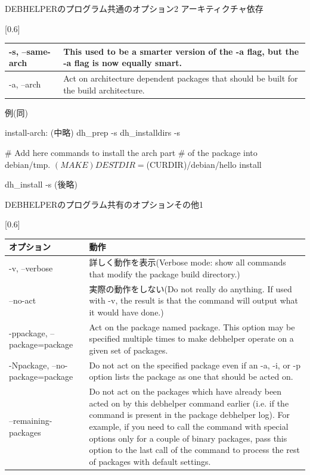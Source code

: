 \begin{frame}[containsverbatim]{DEBHELPERのプログラム共通のオプション2}
アーキティクチャ依存
\begin{table}[htb]
\scalebox{0.6}[0.6]{
\begin{tabular}{|l|p{30em}|} \hline
-s, --same-arch & This used to be a smarter version of the -a flag, but the -a flag is now equally smart. \\ \hline
-a, --arch & Act on architecture dependent packages that should be built for the build architecture. \\ \hline
\end{tabular}
}
\end{table}
例(同)
\begin{commandline}
install-arch:
	(中略)
        dh_prep -s 
        dh_installdirs -s

        # Add here commands to install the arch part 
        # of the package into debian/tmp.
        $(MAKE) DESTDIR=$(CURDIR)/debian/hello install

        dh_install -s
	(後略)
\end{commandline}
\end{frame}

\begin{frame}{DEBHELPERのプログラム共有のオプションその他1}
\begin{table}[htb]
\scalebox{0.6}[0.6]{
\begin{tabular}{|l|p{30em}|} \hline
オプション & 動作 \\ \hline
-v, --verbose & 詳しく動作を表示(Verbose mode: show all commands that modify the package build directory.) \\ \hline
--no-act & 実際の動作をしない(Do not really do anything. If used with -v, the result is that the command will output what it would have done.) \\ \hline
-ppackage, --package=package & Act on the package named package. This option may be specified multiple times to make debhelper operate on a given set of packages. \\ \hline
-Npackage, --no-package=package & Do not act on the specified package even if an -a, -i, or -p option lists the package as one that should be acted on.  \\ \hline
--remaining-packages & Do not act on the packages which have already been acted on by this debhelper command earlier (i.e. if the command is present in the package debhelper log).  For
           example, if you need to call the command with special options only for a couple of binary packages, pass this option to the last call of the command to process
           the rest of packages with default settings. \\ \hline
\end{tabular}
}
\end{table}
\end{frame}

